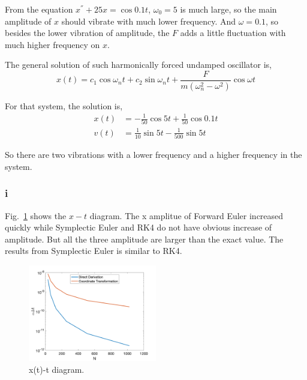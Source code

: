 \documentclass[letterpaper,10pt]{article}
\begin{document}
From the equation $x^{''}+25x=\cos 0.1t$, $\omega_0=5$ is much large, so the main amplitude of $x$ should vibrate with much lower frequency. 
And $\omega=0.1$, so besides the lower vibration of amplitude, the $F$ adds a little fluctuation with much higher frequency on $x$. 

The general solution of such harmonically forced undamped oscillator is, 
\begin{equation*}
  x(t)=c_1\cos \omega_n t+c_2 \sin \omega_n t +\frac{F}{m(\omega_n^2-\omega^2)}\cos \omega t
\end{equation*}

For that system, the solution is, 
\begin{align*}
  x(t)&=-\frac{1}{50}\cos 5t +\frac{1}{50}\cos 0.1t\\
  v(t)&=\frac{1}{10}\sin 5t - \frac{1}{500} \sin 5t
\end{align*}

So there are two vibrations with a lower frequency and a higher frequency in the system. 

\subsubsection{i}
Fig.~\ref{fig2_1} shows the $x-t$ diagram. The x amplitue of Forward Euler increased quickly while Symplectic Euler and RK4 do not have obvious 
increase of amplitude. But all the three amplitude are larger than the exact value. The results from Symplectic Euler is similar to RK4. 
\begin{figure}[h]
  \centering
  \includegraphics[width=0.5\textwidth]{p2_1.png}
  \caption{x(t)-t diagram. }
  \label{fig2_1}
\end{figure}
\end{document}
